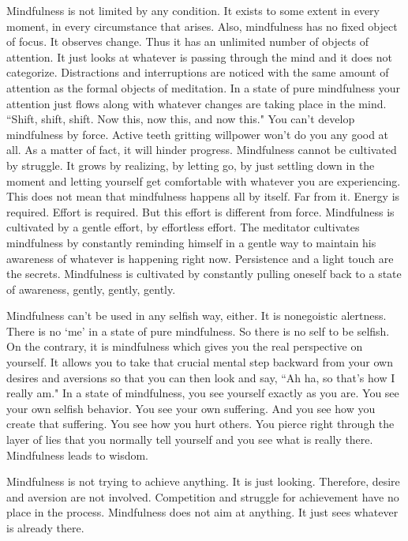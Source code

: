 Mindfulness is not limited by any condition. It exists to some extent in every
moment, in every circumstance that arises. Also, mindfulness has no fixed object
of focus. It observes change. Thus it has an unlimited number of objects of
attention. It just looks at whatever is passing through the mind and it does not
categorize. Distractions and interruptions are noticed with the same amount of
attention as the formal objects of meditation. In a state of pure mindfulness
your attention just flows along with whatever changes are taking place in the
mind. ``Shift, shift, shift. Now this, now this, and now this." You can't develop
mindfulness by force. Active teeth gritting willpower won't do you any good at
all. As a matter of fact, it will hinder progress. Mindfulness cannot be
cultivated by struggle. It grows by realizing, by letting go, by just settling
down in the moment and letting yourself get comfortable with whatever you are
experiencing. This does not mean that mindfulness happens all by itself. Far
from it. Energy is required. Effort is required. But this effort is different
from force. Mindfulness is cultivated by a gentle effort, by effortless effort.
The meditator cultivates mindfulness by constantly reminding himself in a gentle
way to maintain his awareness of whatever is happening right now. Persistence
and a light touch are the secrets. Mindfulness is cultivated by constantly
pulling oneself back to a state of awareness, gently, gently, gently.

Mindfulness can't be used in any selfish way, either. It is nonegoistic
alertness. There is no `me' in a state of pure mindfulness. So there is no self
to be selfish. On the contrary, it is mindfulness which gives you the real
perspective on yourself. It allows you to take that crucial mental step backward
from your own desires and aversions so that you can then look and say, ``Ah ha,
so that's how I really am." In a state of mindfulness, you see yourself exactly
as you are. You see your own selfish behavior. You see your own suffering. And
you see how you create that suffering. You see how you hurt others. You pierce
right through the layer of lies that you normally tell yourself and you see what
is really there. Mindfulness leads to wisdom.

Mindfulness is not trying to achieve anything. It is just looking. Therefore,
desire and aversion are not involved. Competition and struggle for achievement
have no place in the process. Mindfulness does not aim at anything. It just sees
whatever is already there.


